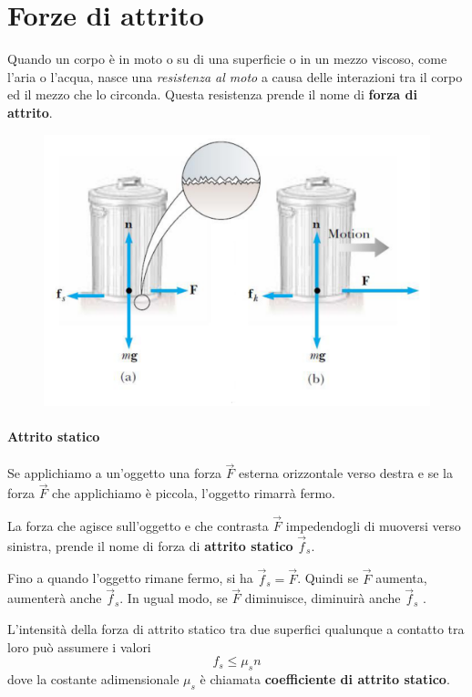 \documentclass[a4paper,11pt,oneside]{book}
\begin{document}
\section{Forze di attrito}
Quando un corpo è in moto o su di una superficie o in un mezzo viscoso, come l’aria o l’acqua, 
nasce una \emph{resistenza al moto} a causa delle interazioni tra il corpo ed il mezzo che lo circonda. Questa resistenza prende il nome di \textbf{forza di attrito}.
\begin{figure}[h]
    \centering
    \includegraphics[scale=0.23]{attrito_bidone}
\end{figure}

\paragraph{Attrito statico}
Se applichiamo a un'oggetto una forza $\vec{F}$ esterna orizzontale verso destra e se la forza $\vec{F}$ che applichiamo è piccola, l'oggetto rimarrà fermo.

La forza che agisce sull'oggetto e che contrasta $\vec{F}$ impedendogli di muoversi verso sinistra, prende il nome di forza di \textbf{attrito statico} $\vec{f}_s$.

Fino a quando l'oggetto rimane fermo, si ha $\vec{f}_s = \vec{F}$. Quindi se $\vec{F}$ aumenta, aumenterà anche $\vec{f}_s$. In ugual modo, se $\vec{F}$ diminuisce, diminuirà anche $\vec{f}_s$ .

L’intensità della forza di attrito statico tra due superfici qualunque a contatto tra loro può assumere i valori
\begin{equation*}
    f_s \le \mu_s n
\end{equation*}
dove la costante adimensionale $\mu_s$ è chiamata \textbf{coefficiente di attrito statico}.
\end{document}
